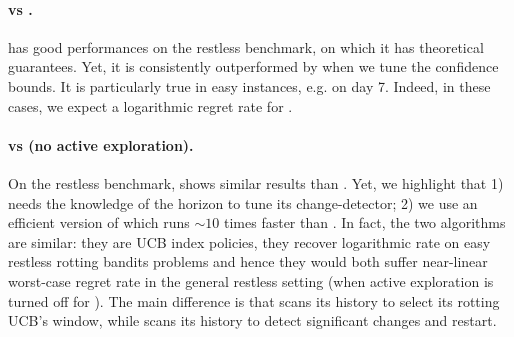 \paragraph{{\RAWUCB} vs {\EXPS}.} {\EXPS} has good performances on the restless benchmark, on which it has theoretical guarantees. Yet, it is consistently outperformed by {\RAWUCB} when we tune the confidence bounds. It is particularly true in easy instances, e.g. on day 7. Indeed, in these cases, we expect a logarithmic regret rate for {\RAWUCB}.

\paragraph{{\RAWUCB} vs {\GLRUCB} (no active exploration).}  On the restless benchmark, {\GLRUCB} shows similar results than {\RAWUCB}. Yet, we highlight that 1) {\GLRUCB} needs the knowledge of the horizon to tune its change-detector; 2) we use an efficient version of {\RAWUCB} which runs $\sim 10$ times faster than {\GLRUCB}. In fact, the two algorithms are similar: they are UCB index policies, they recover logarithmic rate on easy restless rotting bandits problems and hence they would both suffer near-linear worst-case regret rate in the general restless setting (when active exploration is turned off for {\GLRUCB}). The main difference is that {\RAWUCB} scans its history to select its rotting UCB's window, while {\GLRUCB} scans its history to detect significant changes and restart. 

